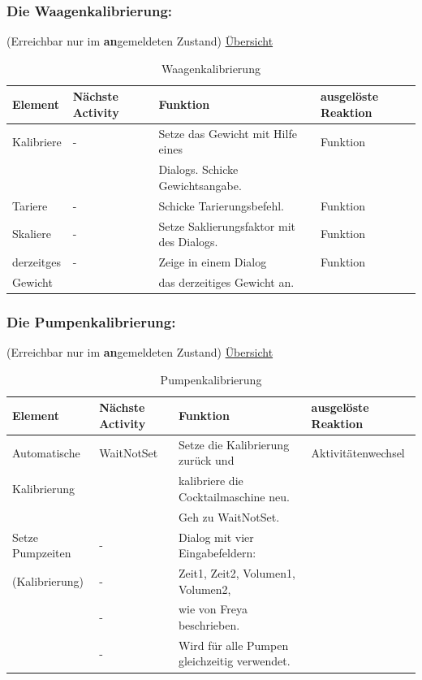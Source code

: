 \subsubsection{Die Waagenkalibrierung:}
(Erreichbar nur im \textbf{an}gemeldeten Zustand)
\hyperref[table:weight]{Übersicht}
\begin{table}
	\centering
	\label{table:weight}
	\caption{Waagenkalibrierung}
	\begin{tabular}{|l|l|l|l|}
		\hline
		\textbf{Element } & \textbf{Nächste Activity } & \textbf{Funktion } & \textbf{ausgelöste Reaktion} \\ \hline
		Kalibriere  & -  & Setze das Gewicht mit Hilfe eines  & Funktion \\
		   &    & Dialogs. Schicke Gewichtsangabe.  &   \\ \hline
		Tariere  & -  & Schicke Tarierungsbefehl.  & Funktion \\ \hline
		Skaliere  & -  & Setze Saklierungsfaktor mit des Dialogs.  & Funktion \\ \hline
		derzeitges    & -  & Zeige in einem Dialog   & Funktion \\
		 Gewicht  &    & das derzeitiges Gewicht an.  &   \\ \hline
	\end{tabular}
\end{table}

\subsubsection{Die Pumpenkalibrierung:}
(Erreichbar nur im \textbf{an}gemeldeten Zustand)
\hyperref[table:pump]{Übersicht}
\begin{table}
	\centering
	\label{table:pump}
	\caption{Pumpenkalibrierung}
	\begin{tabular}{|l|l|l|l|}
		\hline
		\textbf{Element } & \textbf{Nächste Activity } & \textbf{Funktion } & \textbf{ausgelöste Reaktion} \\ \hline
		Automatische   & WaitNotSet  & Setze die Kalibrierung zurück und  & Aktivitätenwechsel \\
		 Kalibrierung  &   & kalibriere die Cocktailmaschine neu.   &  \\ 
		   &   & Geh zu WaitNotSet.  &  \\ \hline
		Setze Pumpzeiten  & -  & Dialog mit vier Eingabefeldern:   &  \\	
		 (Kalibrierung)  & -  &  Zeit1, Zeit2, Volumen1, Volumen2,   &  \\
		   & -  &  wie von Freya beschrieben.  &  \\
		   & -  &  Wird für alle Pumpen gleichzeitig verwendet.  &  \\ \hline
	\end{tabular}
\end{table}




